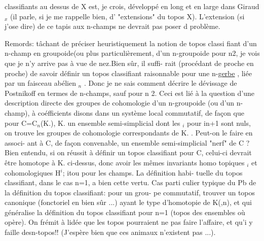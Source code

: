 classifiants au dessus de X est, je crois, développé en long et en large
dans Giraud$_x$ (il parle, si je me rappelle bien, d' "extensions" du topos X).
L'extension (si j'ose dire) de ce tapis aux n-champs ne devrait pas poser d
problème.

Remords: tâchant de préciser heuristiquement la notion de topos classi
fiant d'un n-champ en groupoide(ou plus particulièrement, d'un n-groupoide\hand{)}
pour n\hand{$\geqslant$}2, je vois que je n'y arrive pas à vue de nez.\hand{(}Bien sûr, il suffi-%
rait (procédant de proche en proche) de savoir définir un topos classifiant
raisonnable pour une n-\uline{gerbe} , liée par un faisceau abélien \hand{$\pi$}$_n$ .\hand{)} Donc je
ne sais comment décrire le dévissage de Postnikoff en termes de n-champs,
sauf pour n \hand{$\leqslant$}2. Ceci est lié à la question d'une description directe des
groupes de cohomologie d'un n-groupoide (ou d'un n-champ), à coéfficients
disons dans un système local commutatif, de façon que pour C=C$_n$(K.), K. un
ensemble semi-simplicial dont les \hand{$\pi$}$_i$ pour i\hand{$\geqslant$}n+1 sont nuls, on trouve les
groupes de cohomologie correspondants de K. . Peut-on le faire en associ-%
ant à C, de façon convenable, un ensemble semi-simplicial "nerf" de C ?
Bien entendu, si on réussit à définir un topos classifiant pour C, celui-ci
devrait être homotope à K. ci-dessus, donc avoir les mêmes invariants homo
topiques \hand{$\pi$}$_i$ et cohomologiques H$^i$; itou pour les champs. La définition habi-%
tuelle du topos classifiant, dans le cas n=1, a bien cette vertu. Cas parti
\hand{-}culier typique du Pb de la définition du topos classifiant: pour \hand{$\pi$}un grou-%
pe commutatif, trouver un topos canonique (fonctoriel en \hand{$\pi$} bien sûr ...)
ayant le type d'homotopie de K(\hand{$\pi$},n), et qui généralise la définition du
topos classifiant pour n=1 (topos des ensembles où \hand{$\pi$} opère). On frémit à
lidée que les topos pourraient ne pas faire l'affaire, et qu'i y faille
desn-topos!! (J'espère bien que ces animaux n'existent pas ...)\margin{\hand{(\quad)}}.
